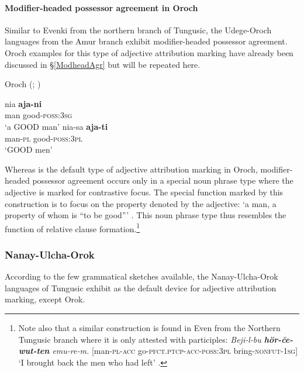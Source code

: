 \paragraph*{Modifier\hyp{}headed possessor agreement in Oroch}
Similar to Evenki from the northern branch of Tungusic, the Udege-Oroch languages from the Amur branch exhibit modifier\hyp{}headed possessor agreement. Oroch examples for this type of adjective attribution marking have already been discussed in \S\ref{ModheadAgr} but will be repeated here.
\begin{exe}
\ex 
\label{oroch modhead}
\rm{Oroch (\citealt[207]{avrorin-etal1967}; \citealt[3]{malchukov2000})}
\begin{xlist}
\ex
\gll 	nia	\textbf{aja-ni}\\
	man good-\textsc{poss:3sg}\\
\glt	‘a GOOD man’
\ex
\gll nia-sa \textbf{aja-ti}\\	
	man-\textsc{pl} good-\textsc{poss:3pl}\\
\glt	‘GOOD men’
\end{xlist}
\end{exe}
Whereas  is the default type of adjective attribution marking in Oroch, modifier\hyp{}headed possessor agreement occurs only in a special noun phrase type where the adjective is marked for contrastive focus. The special function marked by this construction is to focus on the property denoted by the adjective: ‘a man, a property of whom is “to be good”’ \citep[3]{malchukov2000}. This noun phrase type thus resembles the function of relative clause formation.\footnote{Note also that a similar construction is found in Even from the Northern Tungusic branch where it is only attested with participles: \textit{Beji-l-bu \textbf{hör-če-wut-ten} emu-re-m.} [man-\textsc{pl}-\textsc{acc} go-\textsc{pfct.ptcp}-\textsc{acc}-\textsc{poss:3pl} bring-\textsc{nonfut}-\textsc{1sg}] ‘I brought back the men who had left’ \citep[31]{malchukov1995}.}

\subsubsection{Nanay-Ulcha-Orok}
According to the few grammatical sketches available, the Nanay-Ulcha-Orok languages of Tungusic exhibit  as the default device for adjective attribution marking, except Orok.

